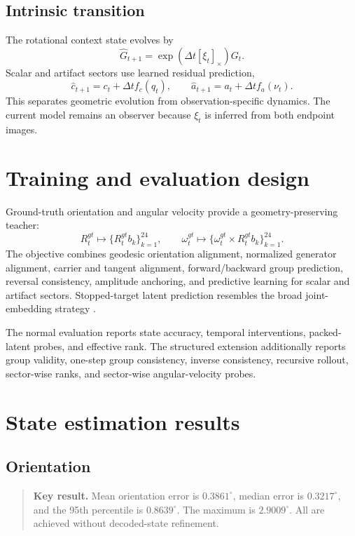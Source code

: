 \documentclass[11pt,a4paper]{article}
\newenvironment{keyresult}{\begin{quote}\color{reportgreen}\textbf{Key result.} }{\end{quote}}
\begin{document}
\subsection{Intrinsic transition}
The rotational context state evolves by
\begin{equation}
\hat G_{t+1}=\exp(\Delta t[\xi_t]_\times)G_t.
\end{equation}
Scalar and artifact sectors use learned residual prediction,
\begin{equation}
\hat c_{t+1}=c_t+\Delta t f_c(q_t),\qquad
\hat a_{t+1}=a_t+\Delta t f_a(\nu_t).
\end{equation}
This separates geometric evolution from observation-specific dynamics. The current model remains an observer because $\xi_t$ is inferred from both endpoint images.

\section{Training and evaluation design}
Ground-truth orientation and angular velocity provide a geometry-preserving teacher:
\begin{equation}
R_t^{gt}\mapsto \{R_t^{gt}b_k\}_{k=1}^{24},\qquad
\omega_t^{gt}\mapsto\{\omega_t^{gt}\times R_t^{gt}b_k\}_{k=1}^{24}.
\end{equation}
The objective combines geodesic orientation alignment, normalized generator alignment, carrier and tangent alignment, forward/backward group prediction, reversal consistency, amplitude anchoring, and predictive learning for scalar and artifact sectors. Stopped-target latent prediction resembles the broad joint-embedding strategy \citep{assran2023ijepa}.

The normal evaluation reports state accuracy, temporal interventions, packed-latent probes, and effective rank. The structured extension additionally reports group validity, one-step group consistency, inverse consistency, recursive rollout, sector-wise ranks, and sector-wise angular-velocity probes.

\section{State estimation results}
\subsection{Orientation}
\begin{keyresult}
Mean orientation error is $0.3861^\circ$, median error is $0.3217^\circ$, and the 95th percentile is $0.8639^\circ$. The maximum is $2.9009^\circ$. All are achieved without decoded-state refinement.
\end{keyresult}
\end{document}
